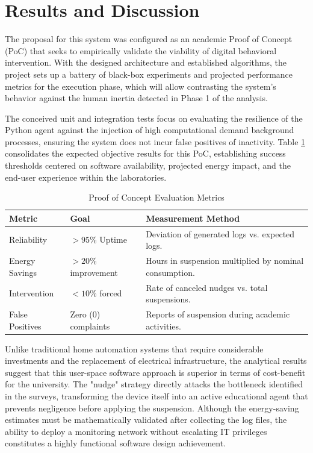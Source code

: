 \documentclass[conference]{IEEEtran}
\begin{document}
\section{Results and Discussion}
The proposal for this system was configured as an academic Proof of Concept (PoC) that seeks to empirically validate the viability of digital behavioral intervention. With the designed architecture and established algorithms, the project sets up a battery of black-box experiments and projected performance metrics for the execution phase, which will allow contrasting the system's behavior against the human inertia detected in Phase 1 of the analysis.

The conceived unit and integration tests focus on evaluating the resilience of the Python agent against the injection of high computational demand background processes, ensuring the system does not incur false positives of inactivity. Table \ref{tab:metrics} consolidates the expected objective results for this PoC, establishing success thresholds centered on software availability, projected energy impact, and the end-user experience within the laboratories.

\begin{table}[htbp]
\caption{Proof of Concept Evaluation Metrics}
\label{tab:metrics}
\centering
\begin{tabular}{|p{2.5cm}|p{2cm}|p{3.5cm}|}
\hline
\textbf{Metric} & \textbf{Goal} & \textbf{Measurement Method} \\
\hline
Reliability & $>95\%$ Uptime & Deviation of generated logs vs. expected logs. \\
\hline
Energy Savings & $>20\%$ improvement & Hours in suspension multiplied by nominal consumption. \\
\hline
Intervention & $<10\%$ forced & Rate of canceled nudges vs. total suspensions. \\
\hline
False Positives & Zero (0) complaints & Reports of suspension during academic activities. \\
\hline
\end{tabular}
\end{table}

Unlike traditional home automation systems that require considerable investments and the replacement of electrical infrastructure, the analytical results suggest that this user-space software approach is superior in terms of cost-benefit for the university. The "nudge" strategy directly attacks the bottleneck identified in the surveys, transforming the device itself into an active educational agent that prevents negligence before applying the suspension. Although the energy-saving estimates must be mathematically validated after collecting the log files, the ability to deploy a monitoring network without escalating IT privileges constitutes a highly functional software design achievement.
\end{document}

